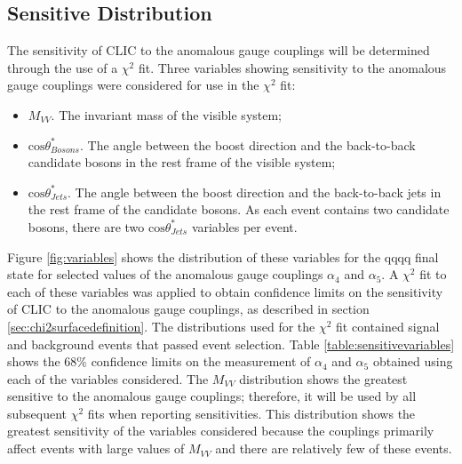 \subsection{Sensitive Distribution}
The sensitivity of CLIC to the anomalous gauge couplings will be determined through the use of a $\chi^{2}$ fit.  Three variables showing sensitivity to the anomalous gauge couplings were considered for use in the $\chi^{2}$ fit:
\begin{itemize}
\item \textbf{$M_{VV}$}.  The invariant mass of the visible system;
\item \textbf{$\text{cos}\theta^{*}_{Bosons}$}.  The angle between the boost direction and the back-to-back candidate bosons in the rest frame of the visible system;
\item \textbf{$\text{cos}\theta^{*}_{Jets}$}.  The angle between the boost direction and the back-to-back jets in the rest frame of the candidate bosons.  As each event contains two candidate bosons, there are two $\text{cos}\theta^{*}_{Jets}$ variables per event. 
\end{itemize}

Figure \ref{fig:variables} shows the distribution of these variables for the  \nu{\nu}qqqq final state for selected values of the anomalous gauge couplings $\alpha_{4}$ and $\alpha_{5}$.  A $\chi^{2}$ fit to each of these variables was applied to obtain confidence limits on the sensitivity of CLIC to the anomalous gauge couplings, as described in section \ref{sec:chi2surfacedefinition}.  The distributions used for the $\chi^{2}$ fit contained signal and background events that passed event selection.  Table \ref{table:sensitivevariables} shows the 68\% confidence limits on the measurement of $\alpha_{4}$ and $\alpha_{5}$ obtained using each of the variables considered.  The $M_{VV}$ distribution shows the greatest sensitive to the anomalous gauge couplings; therefore, it will be used by all subsequent $\chi^{2}$ fits when reporting sensitivities.  This distribution shows the greatest sensitivity of the variables considered because the couplings primarily affect events with large values of $M_{VV}$ and there are relatively few of these events.    


